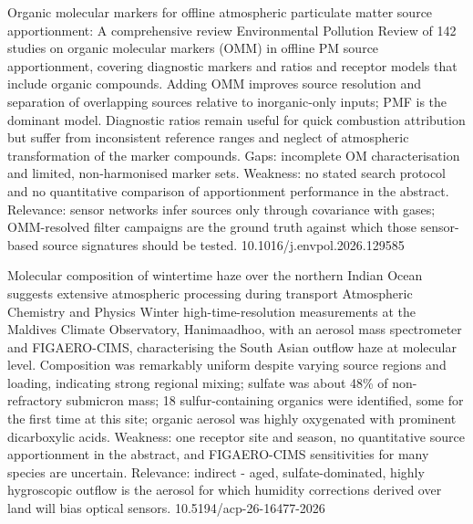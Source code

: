 \documentclass[10pt]{article}
\begin{document}
{Organic molecular markers for offline atmospheric particulate matter source apportionment: A comprehensive review}
{Environmental Pollution}
{Review of 142 studies on organic molecular markers (OMM) in offline PM source apportionment, covering diagnostic markers and ratios and receptor models that include organic compounds. Adding OMM improves source resolution and separation of overlapping sources relative to inorganic-only inputs; PMF is the dominant model. Diagnostic ratios remain useful for quick combustion attribution but suffer from inconsistent reference ranges and neglect of atmospheric transformation of the marker compounds. Gaps: incomplete OM characterisation and limited, non-harmonised marker sets. Weakness: no stated search protocol and no quantitative comparison of apportionment performance in the abstract. Relevance: sensor networks infer sources only through covariance with gases; OMM-resolved filter campaigns are the ground truth against which those sensor-based source signatures should be tested.}
{10.1016/j.envpol.2026.129585}

{Molecular composition of wintertime haze over the northern Indian Ocean suggests extensive atmospheric processing during transport}
{Atmospheric Chemistry and Physics}
{Winter high-time-resolution measurements at the Maldives Climate Observatory, Hanimaadhoo, with an aerosol mass spectrometer and FIGAERO-CIMS, characterising the South Asian outflow haze at molecular level. Composition was remarkably uniform despite varying source regions and loading, indicating strong regional mixing; sulfate was about 48\% of non-refractory submicron mass; 18 sulfur-containing organics were identified, some for the first time at this site; organic aerosol was highly oxygenated with prominent dicarboxylic acids. Weakness: one receptor site and season, no quantitative source apportionment in the abstract, and FIGAERO-CIMS sensitivities for many species are uncertain. Relevance: indirect - aged, sulfate-dominated, highly hygroscopic outflow is the aerosol for which humidity corrections derived over land will bias optical sensors.}
{10.5194/acp-26-16477-2026}
\end{document}
